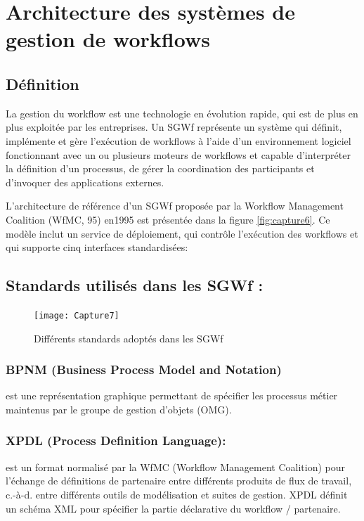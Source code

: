 \section{Architecture des systèmes de gestion de workflows }
\subsection{Définition }
La gestion du workflow est une technologie en évolution rapide, qui est de plus en plus exploitée par les entreprises. Un SGWf représente un système qui définit, implémente et gère l'exécution de workflows à l'aide d'un environnement logiciel fonctionnant avec un ou plusieurs moteurs de workflows et capable d'interpréter la définition d'un processus, de gérer la coordination des participants et d'invoquer des applications externes.  

 L'architecture de référence d’un SGWf proposée par la Workflow Management Coalition (WfMC, 95) en1995 est présentée dans la figure \ref{fig:capture6}. Ce modèle inclut un service de déploiement, qui contrôle l'exécution des workflows et qui supporte cinq interfaces standardisées:
 
 
 
 
 
\subsection{Standards utilisés dans les SGWf :}

\begin{figure}[!h]
	\centering
	\texttt{[image: Capture7]}
	\caption{Différents standards adoptés dans les SGWf}
	\label{fig:capture7}
\end{figure}


\subsubsection {BPNM (Business Process Model and Notation)}
 est une représentation graphique permettant de spécifier les processus métier maintenus par le groupe de gestion d'objets (OMG). 
\subsubsection {XPDL (Process Definition Language):} 
est un format normalisé par la WfMC (Workflow Management Coalition) pour l’échange de définitions de partenaire entre différents produits de flux de travail, c.-à-d. entre différents outils de modélisation et suites de gestion. XPDL définit un schéma XML pour spécifier la partie déclarative du workflow / partenaire.
